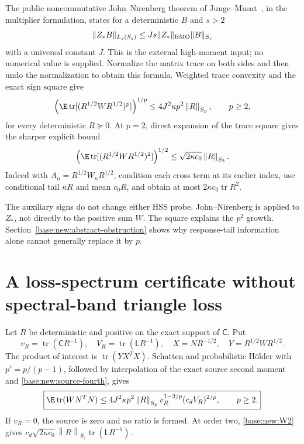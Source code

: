 \documentclass[11pt,oneside,openany,a4paper]{book}
\numberwithin{equation}{chapter}
\theoremstyle{definition}
\theoremstyle{remark}
\DeclareMathOperator{\tr}{tr}\DeclareMathOperator{\rank}{rank}
\newcommand{\Sn}[2]{\left\lVert#1\right\rVert_{S_{#2}}}
\newcommand{\Cov}{\mathsf C}\newcommand{\Loss}{\mathsf L}\newcommand{\Fil}{\mathcal F}
\begin{document}
The public noncommutative John--Nirenberg theorem of Junge--Musat~\cite{JM}, in the multiplier formulation, states for a deterministic $B$ and $s>2$
\[
 \|Z_*B\|_{L_s(S_s)}\le Js\|Z_*\|_{\rm BMO}\|B\|_{S_s}
\]
with a universal constant $J$. This is the external high-moment input; no numerical value is supplied. Normalize the matrix trace on both sides and then undo the normalization to obtain this formula. Weighted trace convexity and the exact sign square give
\begin{equation}\label{base:new:Wmom}
 \left(\E\tr[(R^{1/2}WR^{1/2})^p]\right)^{1/p}
 \le4J^2\kappa p^2\Sn Rp,\qquad p\ge2,
\end{equation}
for every deterministic $R\succeq0$. At $p=2$, direct expansion of the trace square gives the sharper explicit bound
\begin{equation}\label{base:new:W2}
 \left(\E\tr[(R^{1/2}WR^{1/2})^2]\right)^{1/2}
 \le\sqrt{2\kappa c_0}\Sn R2.
\end{equation}
Indeed with $A_n=R^{1/2}W_nR^{1/2}$, condition each cross term at its earlier index, use conditional tail $\kappa R$ and mean $c_0R$, and obtain at most $2\kappa c_0\tr R^2$.

The auxiliary signs do not change either HSS probe. John--Nirenberg is applied to $Z_*$, not directly to the positive sum $W$. The square explains the $p^2$ growth. Section~\ref{base:new:abstract-obstruction} shows why response-tail information alone cannot generally replace it by $p$.

\section{A loss-spectrum certificate without spectral-band triangle loss}\label{base:new:spectral}
Let $R$ be deterministic and positive on the exact support of $\Cov$. Put
\[
 v_R=\tr(\Cov R^{-1}),\quad V_R=\tr(\Loss R^{-1}),\quad
 X=NR^{-1/2},\quad Y=R^{1/2}WR^{1/2}.
\]
The product of interest is $\tr(YX^TX)$. Schatten and probabilistic H\"older with $p'=p/(p-1)$, followed by interpolation of the exact source second moment and \eqref{base:new:source-fourth}, gives
\begin{equation}\label{base:new:metric-joint}
 \boxed{\E\tr(WN^TN)\le4J^2\kappa p^2\Sn Rp
 v_R^{1-2/p}(c_dV_R)^{2/p},\qquad p\ge2.}
\end{equation}
If $v_R=0$, the source is zero and no ratio is formed. At order two, \eqref{base:new:W2} gives
$c_d\sqrt{2\kappa c_0}\Sn R2\tr(\Loss R^{-1})$.
\end{document}

